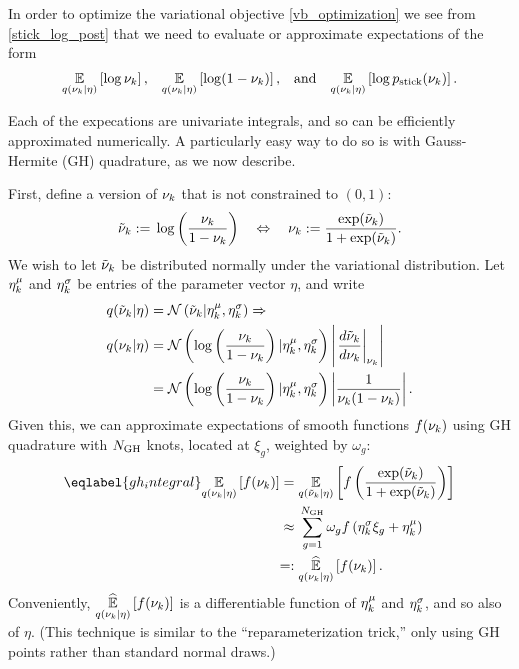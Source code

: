 In order to optimize the variational objective \eqref{vb_optimization} we see
from \eqref{stick_log_post} that we need to evaluate or approximate expectations
of the form
%
\begin{align*}
%
\expect{\q(\nu_\k \vert \eta)}{\log \nu_\k}
\textrm{,}\quad
\expect{\q(\nu_\k \vert \eta)}{\log (1 - \nu_\k)}
\textrm{,}\quad\textrm{and}\quad
\expect{\q(\nu_\k \vert \eta)}{\log \pstick(\nu_\k)}.
%
\end{align*}

Each of the expecations are univariate integrals, and so can be efficiently
approximated numerically.  A particularly easy way to do so is with
Gauss-Hermite (GH) quadrature, as we now describe.

First, define a version of $\nu_k$ that is not constrained to $(0,1)$:
%
\begin{align*}
%
\lnu_\k :={} \log \left( \frac{\nu_\k}{1 - \nu_\k} \right)
\quad\Leftrightarrow\quad
\nu_\k :={} \frac{\exp(\lnu_\k)}{1 + \exp(\lnu_\k)}.
%
\end{align*}
%
We wish to let $\tilde{\nu}_k$ be distributed normally under the variational
distribution.  Let $\eta^{\mu}_k$ and $\eta^{\sigma}_k$ be entries of the parameter
vector $\eta$, and write
%
\begin{align*}
%
\q(\lnu_\k \vert \eta) ={}& \norm{\lnu_\k \vert \lnumean_\k, \lnusd_\k}
\Rightarrow \\
\q(\nu_\k \vert \eta) ={}&
    \norm{\log \left( \frac{\nu_\k}{1 - \nu_\k} \right)
        \vert \lnumean_\k, \lnusd_\k}
    \left|\fracat{d \lnu_\k}{ d\nu_\k}{\nu_\k}\right|
\\={}&
\norm{\log \left( \frac{\nu_\k}{1 - \nu_\k} \right)
        \vert \lnumean_\k, \lnusd_\k}
    \left|\frac{1}{\nu_\k (1 - \nu_\k)}\right|.
%
\end{align*}
%
Given this, we can approximate expectations of smooth functions
$f(\nu_k)$ using GH quadrature with $N_{\mathrm{GH}}$ knots,
located at $\xi_g$, weighted by $\omega_g$:
%
\begin{align}\eqlabel{gh_integral}
%
\expect{\q(\nu_\k \vert \eta)}{f(\nu_\k)} ={}&
\expect{\q(\lnu_\k \vert \eta)}
       {f\left(\frac{\exp(\lnu_\k)}{1 + \exp(\lnu_\k)}\right)}
\nonumber\\\approx{}&
    \sum_{g=1}^{\ngh} \omega_g f\left(\lnusd_\k \xi_{g} + \lnumean_\k\right)
 \nonumber\\=:{}&
\expecthat{\q(\nu_\k \vert \eta)}{f(\nu_\k)}.
%
\end{align}
%
Conveniently, $\underset{q(\nu_k \vert \eta)}{\widehat{\mathbb{E}}}\left[f(\nu_k)\right]$ is a differentiable
function of $\eta^{\mu}_k$ and $\eta^{\sigma}_k$, and so also of $\eta$.  (This
technique is similar to the ``reparameterization trick,'' only using
GH points rather than standard normal draws.)
